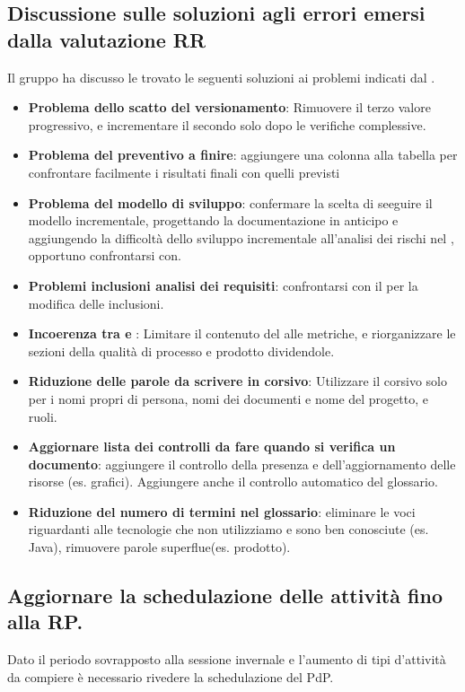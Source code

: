 \subsection{Discussione sulle soluzioni agli errori emersi dalla valutazione RR}
Il gruppo ha discusso le trovato le seguenti soluzioni ai problemi indicati dal \VT{}.
\begin{itemize}
	\item \textbf{Problema dello scatto del versionamento}: Rimuovere il terzo valore progressivo, e incrementare il secondo solo dopo le verifiche complessive.

	\item \textbf{Problema del preventivo a finire}: aggiungere una colonna alla tabella per confrontare facilmente i risultati finali con quelli previsti

	\item \textbf{Problema del modello di sviluppo}: confermare la scelta di seeguire il modello incrementale, progettando la documentazione in anticipo e aggiungendo la difficoltà dello sviluppo incrementale all'analisi dei rischi nel \PdP{}, opportuno confrontarsi con.

	\item \textbf{Problemi inclusioni analisi dei requisiti}: confrontarsi con il \CR{} per la modifica delle inclusioni.

	\item \textbf{Incoerenza tra \NdP{} e \PdQ{}}: Limitare il contenuto del \PdQ{} alle metriche, e riorganizzare le sezioni della qualità di processo e prodotto dividendole.

	\item \textbf{Riduzione delle parole da scrivere in corsivo}: Utilizzare il corsivo solo per i nomi propri di persona, nomi dei documenti e nome del progetto, e ruoli.

	\item \textbf{Aggiornare lista dei controlli da fare quando si verifica un documento}: aggiungere il controllo della presenza e dell'aggiornamento delle risorse (es. grafici). Aggiungere anche il controllo automatico del glossario.

	\item \textbf{Riduzione del numero di termini nel glossario}: eliminare le voci riguardanti alle tecnologie che non utilizziamo e sono ben conosciute (es. Java), rimuovere parole superflue(es. prodotto).
\end{itemize}

\subsection{Aggiornare la schedulazione delle attività fino alla RP.}
Dato il periodo sovrapposto alla sessione  invernale e l'aumento di tipi d'attività da compiere è necessario rivedere la schedulazione del PdP.

